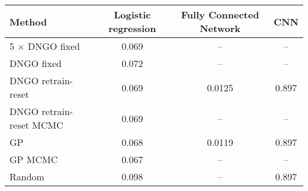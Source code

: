 \documentclass[conference,compsoc]{IEEEtran}
\theoremstyle{definition}
\begin{document}
    \begin{minipage}{\linewidth}
        \centering
        \begin{tabular}{|l||c|c|c|}  
            \hline
            \textbf{Method} & \textbf{Logistic regression} & \textbf{Fully Connected Network} & \textbf{CNN} \\
            \hline
            5 $\times$ DNGO fixed    & 0.069  &        --        & -- \\
            DNGO fixed               & 0.072  &        --        & -- \\
            DNGO retrain-reset       & 0.069  & 0.0125           & 0.897  \\
            DNGO retrain-reset MCMC  & 0.069  &        --        & -- \\
            GP                       & 0.068  & 0.0119           & 0.897  \\
            GP MCMC                  & 0.067  &        --        & -- \\
            Random                   & 0.098  &        --        & 0.897  \\
            \hline
        \end{tabular}
    \end{minipage}
    \begin{minipage}{\linewidth}
        \centering
        
    \end{minipage}
    \vfill
\end{document}
